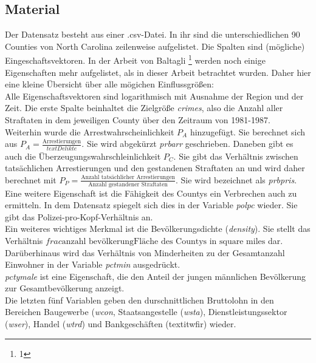 \subsection{Material}
Der Datensatz besteht aus einer .csv-Datei.
In ihr sind die unterschiedlichen 90 Counties von North Carolina zeilenweise aufgelistet.
Die Spalten sind (m\"ogliche) Eingeschaftsvektoren.
In der Arbeit von Baltagli \footnote{1} werden noch einige Eigenschaften mehr aufgelistet, als in dieser Arbeit betrachtet wurden. Daher hier eine kleine \"Ubersicht über alle m\"ogichen Einflussgr\"o\ss{}en: \\
Alle Eigenschaftsvektoren sind logarithmisch mit Ausnahme der Region und der Zeit.
Die erste Spalte beinhaltet die Zielgr\"o\ss{}e \textit{crimes}, also die Anzahl aller Straftaten in dem jeweiligen County \"uber den Zeitraum von 1981-1987. \\
Weiterhin wurde die Arrestwahrscheinlichkeit $P_A$ hinzugef\"ugt. Sie berechnet sich aus $P_A = \frac{\text{Arrestierungen}}{text{Delikte}}$. Sie wird abgek\"urzt \textit{prbarr} geschrieben.
Daneben gibt es auch die \"Uberzeugungswahrschleinlichkeit $P_C$. Sie gibt das Verh\"altnis zwischen tats\"achlichen Arrestierungen und den gestandenen Straftaten an und wird daher berechnet mit $P_P = \frac{\text{Anzahl tats\"achlicher Arrestierungen}}{\text{Anzahl gestandener Straftaten}}$. Sie wird bezeichnet als \textit{prbpris}. \\
Eine weitere Eigenschaft ist die Fähigkeit des Countys ein Verbrechen auch zu ermitteln. In dem Datensatz spiegelt sich dies in der Variable \textit{polpc} wieder. Sie gibt das Polizei-pro-Kopf-Verhältnis an. \\
Ein weiteres wichtiges Merkmal ist die Bev\"olkerungsdichte (\textit{density}). Sie stellt das Verhältnis $frac{\text{anzahl bev\"olkerung}}{\text{Fl\"ache des Countys in square miles}}$ dar. \\
Darüberhinaus wird das Verh\"altnis von Minderheiten zu der Gesamtanzahl Einwohner in der Variable \textit{pctmin} ausgedrückt. \\
\textit{pctymale} ist eine Eigenschaft, die den Anteil der jungen m\"annlichen Bev\"olkerung zur Gesamtbev\"olkerung anzeigt. \\
Die letzten f\"unf Variablen geben den durschnittlichen Bruttolohn in den Bereichen Baugewerbe (\textit{wcon}, Staatsangestelle (\textit{wsta}), Dienstleistungssektor (\textit{wser}), Handel (\textit{wtrd}) und Bankgesch\"aften (textit{wfir}) wieder. \\


